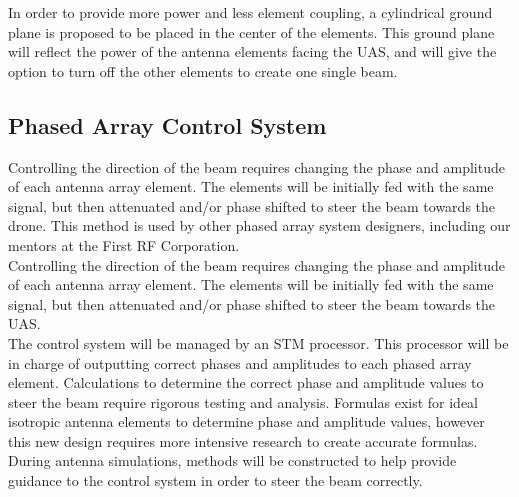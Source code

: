 \documentclass[UROP.tex]{subfiles}
\begin{document}
	In order to provide more power and less element coupling, a cylindrical ground plane is proposed to be placed in the center of the elements. This ground plane will reflect the power of the antenna elements facing the UAS, and will give the option to turn off the other elements to create one single beam.\\

	
\subsection{Phased Array Control System}

	Controlling the direction of the beam requires changing the phase and amplitude of each antenna array element.  The elements will be initially fed with the same signal, but then attenuated and/or phase shifted to steer the beam towards the drone.  This method is used by other phased array system designers, including our mentors at the First RF Corporation.  \\

	Controlling the direction of the beam requires changing the phase and amplitude of each antenna array element.  The elements will be initially fed with the same signal, but then attenuated and/or phase shifted to steer the beam towards the UAS.  \\

	
	The control system will be managed by an STM processor.  This processor will be in charge of outputting correct phases and amplitudes to each phased array element.  Calculations to determine the correct phase and amplitude values to steer the beam require rigorous testing and analysis.  Formulas exist for ideal isotropic antenna elements to determine phase and amplitude values, however this new design requires more intensive research to create accurate formulas.  During antenna simulations, methods will be constructed to help provide guidance to the control system in order to steer the beam correctly. \\
	
\end{document}
